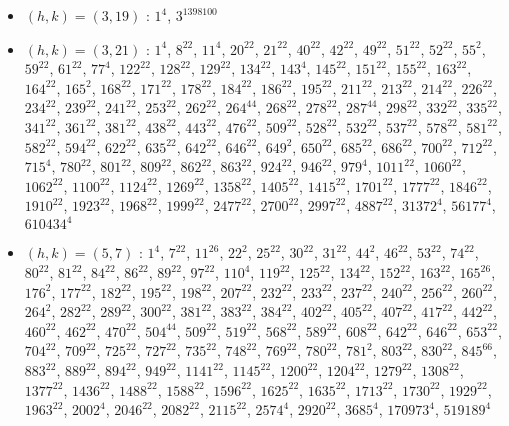 \begin{itemize}
\item $(h,k)=(3,19)$ : $1^{4}$, $3^{1398100}$
\item $(h,k)=(3,21)$ : $1^{4}$, $8^{22}$, $11^{4}$, $20^{22}$, $21^{22}$, $40^{22}$, $42^{22}$, $49^{22}$, $51^{22}$, $52^{22}$, $55^{2}$, $59^{22}$, $61^{22}$, $77^{4}$, $122^{22}$, $128^{22}$, $129^{22}$, $134^{22}$, $143^{4}$, $145^{22}$, $151^{22}$, $155^{22}$, $163^{22}$, $164^{22}$, $165^{2}$, $168^{22}$, $171^{22}$, $178^{22}$, $184^{22}$, $186^{22}$, $195^{22}$, $211^{22}$, $213^{22}$, $214^{22}$, $226^{22}$, $234^{22}$, $239^{22}$, $241^{22}$, $253^{22}$, $262^{22}$, $264^{44}$, $268^{22}$, $278^{22}$, $287^{44}$, $298^{22}$, $332^{22}$, $335^{22}$, $341^{22}$, $361^{22}$, $381^{22}$, $438^{22}$, $443^{22}$, $476^{22}$, $509^{22}$, $528^{22}$, $532^{22}$, $537^{22}$, $578^{22}$, $581^{22}$, $582^{22}$, $594^{22}$, $622^{22}$, $635^{22}$, $642^{22}$, $646^{22}$, $649^{2}$, $650^{22}$, $685^{22}$, $686^{22}$, $700^{22}$, $712^{22}$, $715^{4}$, $780^{22}$, $801^{22}$, $809^{22}$, $862^{22}$, $863^{22}$, $924^{22}$, $946^{22}$, $979^{4}$, $1011^{22}$, $1060^{22}$, $1062^{22}$, $1100^{22}$, $1124^{22}$, $1269^{22}$, $1358^{22}$, $1405^{22}$, $1415^{22}$, $1701^{22}$, $1777^{22}$, $1846^{22}$, $1910^{22}$, $1923^{22}$, $1968^{22}$, $1999^{22}$, $2477^{22}$, $2700^{22}$, $2997^{22}$, $4887^{22}$, $31372^{4}$, $56177^{4}$, $610434^{4}$
\item $(h,k)=(5,7)$ : $1^{4}$, $7^{22}$, $11^{26}$, $22^{2}$, $25^{22}$, $30^{22}$, $31^{22}$, $44^{2}$, $46^{22}$, $53^{22}$, $74^{22}$, $80^{22}$, $81^{22}$, $84^{22}$, $86^{22}$, $89^{22}$, $97^{22}$, $110^{4}$, $119^{22}$, $125^{22}$, $134^{22}$, $152^{22}$, $163^{22}$, $165^{26}$, $176^{2}$, $177^{22}$, $182^{22}$, $195^{22}$, $198^{22}$, $207^{22}$, $232^{22}$, $233^{22}$, $237^{22}$, $240^{22}$, $256^{22}$, $260^{22}$, $264^{2}$, $282^{22}$, $289^{22}$, $300^{22}$, $381^{22}$, $383^{22}$, $384^{22}$, $402^{22}$, $405^{22}$, $407^{22}$, $417^{22}$, $442^{22}$, $460^{22}$, $462^{22}$, $470^{22}$, $504^{44}$, $509^{22}$, $519^{22}$, $568^{22}$, $589^{22}$, $608^{22}$, $642^{22}$, $646^{22}$, $653^{22}$, $704^{22}$, $709^{22}$, $725^{22}$, $727^{22}$, $735^{22}$, $748^{22}$, $769^{22}$, $780^{22}$, $781^{2}$, $803^{22}$, $830^{22}$, $845^{66}$, $883^{22}$, $889^{22}$, $894^{22}$, $949^{22}$, $1141^{22}$, $1145^{22}$, $1200^{22}$, $1204^{22}$, $1279^{22}$, $1308^{22}$, $1377^{22}$, $1436^{22}$, $1488^{22}$, $1588^{22}$, $1596^{22}$, $1625^{22}$, $1635^{22}$, $1713^{22}$, $1730^{22}$, $1929^{22}$, $1963^{22}$, $2002^{4}$, $2046^{22}$, $2082^{22}$, $2115^{22}$, $2574^{4}$, $2920^{22}$, $3685^{4}$, $170973^{4}$, $519189^{4}$

\end{itemize}
